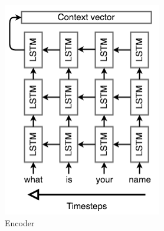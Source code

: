 \begin{figure}
     \centering
     \begin{subfigure}[b]{0.25\textwidth}
         \centering
         \includegraphics[width=\textwidth]{images/encoder.png}
         \caption{Encoder}
         \label{fig:encoder}
     \end{subfigure}
     \begin{subfigure}[b]{0.25\textwidth}
         \centering

\end{subfigure}
\end{figure}
